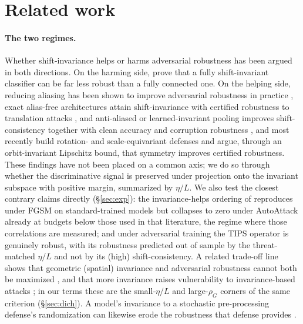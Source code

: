 \documentclass{article}
\theoremstyle{definition}
\begin{document}
\section{Related work}\label{sec:related}
\paragraph{The two regimes.} Whether shift-invariance helps or harms adversarial robustness has been argued in both directions. On the harming side, \citet{ge2021shift} prove that a fully shift-invariant classifier can be far less robust than a fully connected one. On the helping side, reducing aliasing has been shown to improve adversarial robustness in practice \citep{grabinski2022aliasing,grabinski2023fix,rodriguezmunoz2022aliasing}, exact alias-free architectures attain shift-invariance with certified robustness to translation attacks \citep{michaeli2023alias}, and anti-aliased or learned-invariant pooling improves shift-consistency together with clean accuracy and corruption robustness \citep{zhang2019making,saha2024improving}, and most recently \citet{wang2025bridging} build rotation- and scale-equivariant defenses and argue, through an orbit-invariant Lipschitz bound, that symmetry improves certified robustness. These findings have not been placed on a common axis; we do so through whether the discriminative signal is preserved under projection onto the invariant subspace with positive margin, summarized by $\eta/L$. We also test the closest contrary claims directly (\S\ref{sec:exp}): the invariance-helps ordering of \citet{saha2024improving} reproduces under FGSM on standard-trained models but collapses to zero under AutoAttack already at budgets below those used in that literature, the regime where those correlations are measured; and under adversarial training the TIPS operator is genuinely robust, with its robustness predicted out of sample by the threat-matched $\eta/L$ and not by its (high) shift-consistency. A related trade-off line shows that geometric (spatial) invariance and adversarial robustness cannot both be maximized \citep{kamath2021canwehaveitall,tramer2019multiple}, and that more invariance raises vulnerability to invariance-based attacks \citep{tramer2020fundamental}; in our terms these are the small-$\eta/L$ and large-$\rho_G$ corners of the same criterion (\S\ref{sec:dich}). A model's invariance to a stochastic pre-processing defense's randomization can likewise erode the robustness that defense provides \citep{gao2022limitations}.
\end{document}
